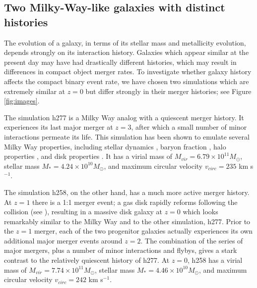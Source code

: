 \documentclass[nofootinbib,twocolumn,prd]{emulateapj}
\newcommand\editremark[1]{{\color{red}#1}}
\newcommand\msun{M_\odot}
\begin{document}
\subsection{Two Milky-Way-like galaxies with distinct histories }

The evolution
of a galaxy, in terms of its stellar mass and metallicity evolution,
depends strongly on its interaction history.  Galaxies which appear
similar at the present day may have had drastically different
histories, which may result in differences in compact object merger
rates.  To investigate whether galaxy history affects the compact binary event
rate, we have chosen two simulations which are extremely similar at $z
= 0$ but differ strongly in their merger histories; see Figure \ref{fig:images}.

The simulation h277  is a Milky Way analog with a
quiescent merger history.  It experiences its last major merger at $z
= 3$, after which a small number of minor interactions permeate its
life.  This simulation has been shown to emulate several Milky Way
properties, including stellar dynamics
\citep{Loebman12,Loebman14,Kassin14}, baryon fraction
\citep{Munshi13}, halo properties \citep{Zolotov09,Zolotov10}, and
disk properties \citep{Brooks11}.  It has a virial mass of $M_{vir} =
6.79 \times 10^{11} \msun$, stellar mass $M_* = 4.24 \times 10^{10}
\msun$, and maximum circular velocity $v_{circ} = 235$ km s$^{-1}$.

  The simulation h258, on the other hand, has a much
  more active merger history.  At $z = 1$ there is a 1:1 merger event;
  a gas disk rapidly reforms following the collision (see
  \citet{Governato09}), resulting in a massive disk galaxy at $z = 0$
  which looks remarkably similar to the Milky Way and to the other
  simulation, h277.  Prior to the $z = 1$ merger, each of the two
  progenitor galaxies actually experiences its own additional major
  merger events around $z = 2$.  The combination of
  the series of major mergers, plus a number of minor interactions and
  flybys, gives a stark contrast to the relatively quiescent history
  of h277.  At $z = 0$, h258 has a virial mass of $M_{vir} = 7.74
  \times 10^{11} \msun$, stellar mass $M_* = 4.46 \times 10^{10}
  \msun$, and maximum circular velocity $v_{circ} = 242$ km s$^{-1}$.  %
\end{document}
